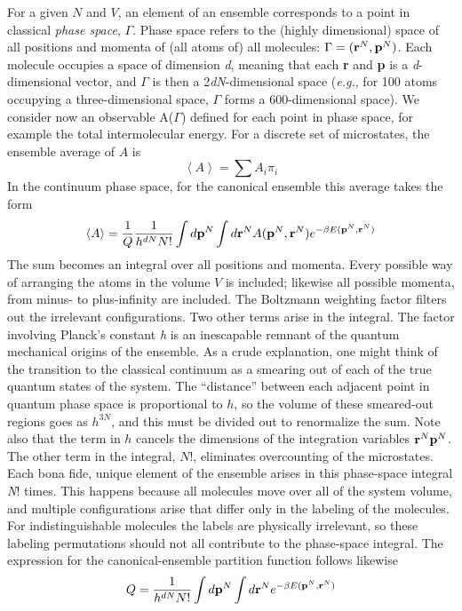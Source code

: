 \documentclass[]{article}
\begin{document}
For a given $N$ and $V$, an element of an ensemble corresponds to a point in
classical \emph{phase space}, $\Gamma$. Phase space refers to the (highly
dimensional) space of all positions and momenta of (all atoms of) all
molecules: $\Gamma  = ({{\bf{r}}^N},{{\bf{p}}^N})$. Each molecule occupies a space of dimension \emph{d},
meaning that each \textbf{r} and \textbf{p} is a \emph{d}-dimensional
vector, and $\Gamma$ is then a 2\emph{dN}-dimensional space (\emph{e.g.}, for
100 atoms occupying a three-dimensional space, $\Gamma$ forms a 600-dimensional
space). We consider now an observable A($\Gamma$) defined for each point in
phase space, for example the total intermolecular energy. For a discrete
set of microstates, the ensemble average of $A$ is
\[\left\langle A \right\rangle  = \sum {{A_i}{\pi _i}} \]
In the continuum phase space, for the canonical ensemble this average
takes the form
\[\left\langle A \right\rangle  = \frac{1}{Q} \frac{1}{h^{dN}N!}\int {d{{\bf p}^N}\int {d{{\bf r}^N}A({{\bf p}^N},{{\bf r}^N})} {e^{ - \beta E({{\bf p}^N},{{\bf r}^N})}}} \]
The sum becomes an integral over all positions and momenta. Every
possible way of arranging the atoms in the volume $V$ is included;
likewise all possible momenta, from minus- to plus-infinity are
included. The Boltzmann weighting factor filters out the irrelevant
configurations. Two other terms arise in the integral. The factor
involving Planck's constant \emph{h} is an inescapable remnant of the
quantum mechanical origins of the ensemble. As a crude explanation, one
might think of the transition to the classical continuum as a smearing
out of each of the true quantum states of the system. The ``distance''
between each adjacent point in quantum phase space is proportional to
$h$, so the volume of these smeared-out regions goes as
$h^{3N}$, and this must be divided out to
renormalize the sum. Note also that the term in $h$ cancels the
dimensions of the integration variables
${\bf r}^N{\bf p}^N$. The other term in the
integral, $N!$, eliminates overcounting of the microstates. Each
bona fide, unique element of the ensemble arises in this phase-space
integral \emph{N}! times. This happens because all molecules move over
all of the system volume, and multiple configurations arise that differ
only in the labeling of the molecules. For indistinguishable molecules
the labels are physically irrelevant, so these labeling permutations
should not all contribute to the phase-space integral. The expression
for the canonical-ensemble partition function follows likewise
\[Q = \frac{1}{h^{dN}N!}\int {d{{\bf p}^N}\int {d{{\bf r}^N}} {e^{ - \beta E({{\bf p}^N},{{\bf r}^N})}}} \]
\end{document}
